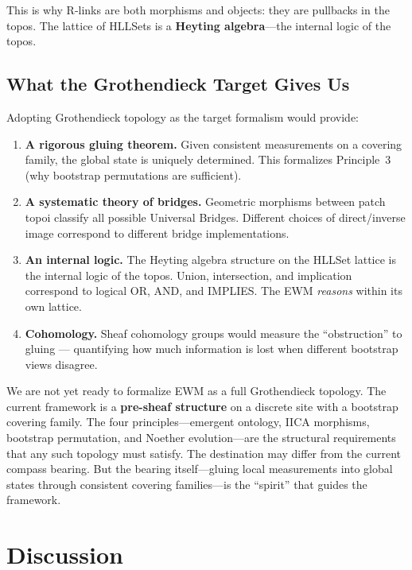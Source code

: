 \documentclass[11pt,a4paper]{article}
\theoremstyle{remark}
\begin{document}
This is why R-links are both morphisms and objects: they are pullbacks in the topos.
The lattice of HLLSets is a \textbf{Heyting algebra}---the internal logic of the topos.

\subsection{What the Grothendieck Target Gives Us}

Adopting Grothendieck topology as the target formalism would provide:

\begin{enumerate}[leftmargin=*,nosep]
  \item \textbf{A rigorous gluing theorem.} Given consistent measurements on a covering
    family, the global state is uniquely determined. This formalizes Principle~3 (why
    bootstrap permutations are sufficient).
  \item \textbf{A systematic theory of bridges.} Geometric morphisms between patch
    topoi classify all possible Universal Bridges. Different choices of direct/inverse
    image correspond to different bridge implementations.
  \item \textbf{An internal logic.} The Heyting algebra structure on the HLLSet lattice
    is the internal logic of the topos. Union, intersection, and implication correspond
    to logical OR, AND, and IMPLIES. The EWM \textit{reasons} within its own lattice.
  \item \textbf{Cohomology.} Sheaf cohomology groups would measure the ``obstruction''
    to gluing --- quantifying how much information is lost when different bootstrap views
    disagree.
\end{enumerate}

We are not yet ready to formalize EWM as a full Grothendieck topology. The current
framework is a \textbf{pre-sheaf structure} on a discrete site with a bootstrap covering
family. The four principles---emergent ontology, IICA morphisms, bootstrap permutation,
and Noether evolution---are the structural requirements that any such topology must
satisfy. The destination may differ from the current compass bearing. But the bearing
itself---gluing local measurements into global states through consistent covering
families---is the ``spirit'' that guides the framework.

\section{Discussion}
\label{sec:discussion}
\end{document}
